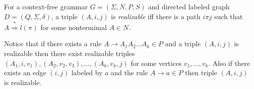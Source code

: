 \begin{definition}
\label{def:triple}
For a context-free grammar $G = (\Sigma, N, P, S)$ and directed labeled graph $D = (Q, \Sigma, \delta)$, a triple $(A, i, j)$ is \textit{realizable} iff there is a path $i\pi j$ such that $A \stackrel {*}{\Rightarrow } l(\pi)$ for some nontermimal $A \in N$.
\end{definition}
Notice that if there exists a rule $A \rightarrow A_1A_2...A_k \in P$ and a triple $(A, i,  j)$ is realizable then there exist realizable triples $(A_1, i, v_1), (A_2, v_2, v_3), ..., (A_k, v_k, j)$ for some vertices $v_1, ..., v_k$. Also if there exists an edge $(i, j)$ labeled by $a$ and the rule $A \rightarrow a \in P$ then triple $(A, i, j)$ is realizable.

